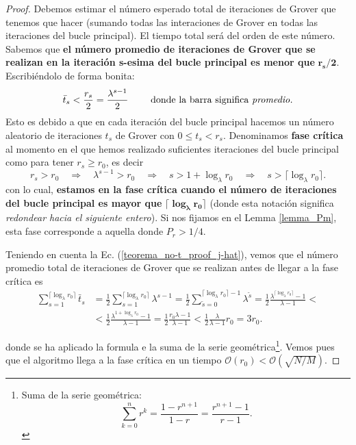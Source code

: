 \documentclass[a4paper,11pt]{article} %
\numberwithin{equation}{section}
\def\rqa{\quad \Rightarrow \quad}
\begin{document}
\begin{proof}
Debemos estimar el número esperado total de iteraciones de Grover que tenemos que hacer (sumando todas las interaciones de Grover en todas las iteraciones del bucle principal). El tiempo total será del orden de este número. Sabemos que \textbf{el número promedio de iteraciones de Grover que se realizan en la iteración s-esima del bucle principal es menor que} $\bm{r_s/2}$. Escribiéndolo de forma bonita:
\begin{equation} \label{teorema_no-t_proof_j-hat}
\bar{t}_s < \frac{r_s}{2} = \frac{\lambda^{s-1}}{2} \qquad \text{ donde la barra significa \textit{promedio}}.
\end{equation} 
Esto es debido a que en cada iteración del bucle principal hacemos un número aleatorio de iteraciones $t_s$ de Grover con $0 \leq t_s < r_s$.  Denominamos \textbf{fase crítica} al momento en el que hemos realizado suficientes iteraciones del bucle principal como para tener $r_s \geq r_0$, es decir
\begin{equation} 
r_s > r_0 \rqa \lambda^{s-1} > r_0 \rqa s > 1 + \log_{\lambda} r_0  \rqa s > \lceil \log_\lambda r_0 \rceil.
\end{equation}
con lo cual, \textbf{estamos en la fase crítica cuando el número de iteraciones del bucle principal es mayor que} $\bm{\lceil \log_{\lambda} r_0 \rceil}$ (donde esta notación significa \textit{redondear hacia el siguiente entero}).  Si nos fijamos en el Lemma \ref{lemma_Pm}, esta fase corresponde a aquella donde $P_r > 1/4$.

Teniendo en cuenta la Ec. (\ref{teorema_no-t_proof_j-hat}), vemos que el número promedio total de iteraciones de Grover que se realizan antes de llegar a la fase crítica es
\begin{equation} \label{teorema_no-t_3r0}
\begin{split}
\sum_{s=1}^{\lceil \log_\lambda r_0 \rceil} \bar{t}_s 
& = \frac{1}{2} \sum_{s=1}^{\lceil \log_\lambda r_0 \rceil} \lambda^{s-1} 
= \frac{1}{2} \sum_{\tilde{s}=0}^{\lceil \log_\lambda r_0 \rceil-1} \lambda^{\tilde{s}}  = \frac{1}{2} \frac{ \lambda^{\lceil \log_\lambda r_0 \rceil} -1 }{\lambda -1 }  < \\
& < \frac{1}{2} \frac{\lambda^{1 + \log_\lambda r_0} -1 }{\lambda -1} = \frac{1}{2} \frac{r_0 \lambda -1 }{\lambda  -1 }  < 
 \frac{1}{2} \frac{\lambda}{\lambda - 1} r_0 = \boxed{3 r_0}.
\end{split}
\end{equation}

donde se ha aplicado la formula e la suma de la serie geométrica\footnote{Suma de la serie geométrica: \begin{equation} \label{ec_no-t_suma-geometrica}
\sum_{k=0}^n r^k = \frac{1-r^{n+1}}{1-r} = \frac{r^{n+1} -1 }{r -1}.
\end{equation}}. 
Vemos pues que el algoritmo llega a la fase crítica en un tiempo $\mathcal{O} (r_0) < \mathcal{O}(\sqrt{N/M})$. 


\end{proof}
\end{document}
